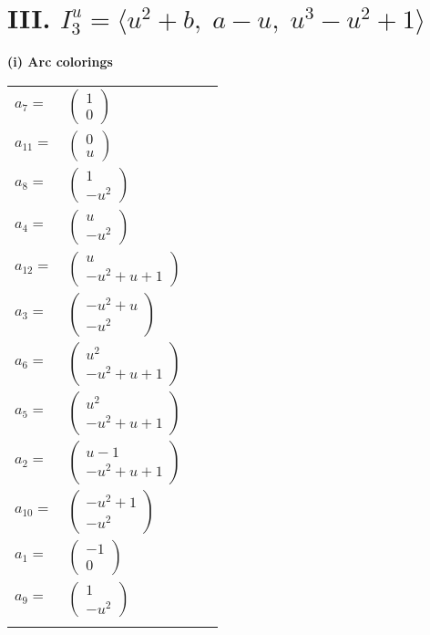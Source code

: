 \documentclass[1p]{elsarticle_modified}
\theoremstyle{definition}
\begin{document}
\centering \section*{III. $I^u_{3}= \langle u^2+b,\;a- u,\;u^3- u^2+1 \rangle$}
\flushleft \textbf{(i) Arc colorings}\\
\begin{tabular}{m{7pt} m{180pt} m{7pt} m{180pt} }
\flushright $a_{7}=$&$\begin{pmatrix}1\\0\end{pmatrix}$ \\
\flushright $a_{11}=$&$\begin{pmatrix}0\\u\end{pmatrix}$ \\
\flushright $a_{8}=$&$\begin{pmatrix}1\\- u^2\end{pmatrix}$ \\
\flushright $a_{4}=$&$\begin{pmatrix}u\\- u^2\end{pmatrix}$ \\
\flushright $a_{12}=$&$\begin{pmatrix}u\\- u^2+u+1\end{pmatrix}$ \\
\flushright $a_{3}=$&$\begin{pmatrix}- u^2+u\\- u^2\end{pmatrix}$ \\
\flushright $a_{6}=$&$\begin{pmatrix}u^2\\- u^2+u+1\end{pmatrix}$ \\
\flushright $a_{5}=$&$\begin{pmatrix}u^2\\- u^2+u+1\end{pmatrix}$ \\
\flushright $a_{2}=$&$\begin{pmatrix}u-1\\- u^2+u+1\end{pmatrix}$ \\
\flushright $a_{10}=$&$\begin{pmatrix}- u^2+1\\- u^2\end{pmatrix}$ \\
\flushright $a_{1}=$&$\begin{pmatrix}-1\\0\end{pmatrix}$ \\
\flushright $a_{9}=$&$\begin{pmatrix}1\\- u^2\end{pmatrix}$\\&\end{tabular}
\end{document}
